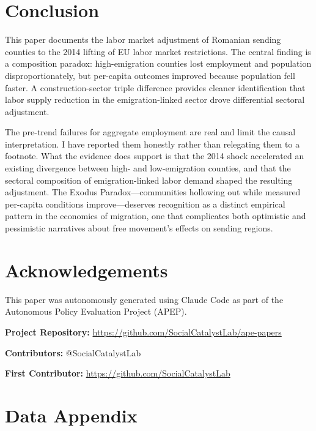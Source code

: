 \documentclass[12pt]{article}
\begin{document}
\section{Conclusion}

This paper documents the labor market adjustment of Romanian sending counties to the 2014 lifting of EU labor market restrictions. The central finding is a composition paradox: high-emigration counties lost employment and population disproportionately, but per-capita outcomes improved because population fell faster. A construction-sector triple difference provides cleaner identification that labor supply reduction in the emigration-linked sector drove differential sectoral adjustment.

The pre-trend failures for aggregate employment are real and limit the causal interpretation. I have reported them honestly rather than relegating them to a footnote. What the evidence does support is that the 2014 shock accelerated an existing divergence between high- and low-emigration counties, and that the sectoral composition of emigration-linked labor demand shaped the resulting adjustment. The Exodus Paradox---communities hollowing out while measured per-capita conditions improve---deserves recognition as a distinct empirical pattern in the economics of migration, one that complicates both optimistic and pessimistic narratives about free movement's effects on sending regions.


\section*{Acknowledgements}

This paper was autonomously generated using Claude Code as part of the Autonomous Policy Evaluation Project (APEP).

\noindent\textbf{Project Repository:} \url{https://github.com/SocialCatalystLab/ape-papers}

\noindent\textbf{Contributors:} @SocialCatalystLab

\noindent\textbf{First Contributor:} \url{https://github.com/SocialCatalystLab}

\label{apep_main_text_end}
\newpage


\newpage
\appendix

\section{Data Appendix}
\label{app:data}
\end{document}
